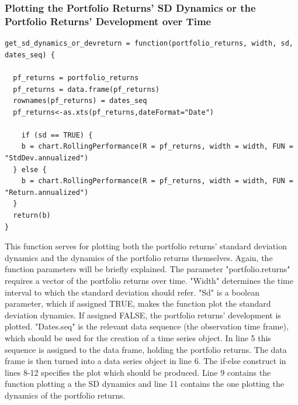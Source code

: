 \documentclass{article}
\begin{document}
\subsubsection{Plotting the Portfolio Returns' SD Dynamics or the Portfolio Returns' Development over Time}
\begin{lstlisting}[caption={This example shows how the portfolio returns' SD dynamics or the portfolio returns' dynamics are plotted in R.}, label=code:1, frame=single]
get_sd_dynamics_or_devreturn = function(portfolio_returns, width, sd, dates_seq) {

  pf_returns = portfolio_returns
  pf_returns = data.frame(pf_returns)
  rownames(pf_returns) = dates_seq
  pf_returns<-as.xts(pf_returns,dateFormat="Date")
  
    if (sd == TRUE) { 
    b = chart.RollingPerformance(R = pf_returns, width = width, FUN = "StdDev.annualized")
  } else { 
    b = chart.RollingPerformance(R = pf_returns, width = width, FUN = "Return.annualized")
  }
  return(b)
}
\end{lstlisting}
This function serves for plotting both the portfolio returns' standard deviation dynamics and the dynamics of the portfolio returns themselves. Again, the function parameters will be briefly explained. The parameter "portfolio.returns" requires a vector of the portfolio returns over time. "Width" determines the time interval to which the standard deviation should refer. "Sd" is a boolean parameter, which if assigned TRUE, makes the function plot the standard deviation dynamics. If assigned FALSE, the portfolio returns' development is plotted. "Dates.seq" is the relevant data sequence (the observation time frame), which should be used for the creation of a time series object. In line 5 this sequence is assigned to the data frame, holding the portfolio returns. The data frame is then turned into a data series object in line 6. The if-else construct in lines 8-12 specifies the plot which should be produced. Line 9 contains the function plotting a the SD dynamics and line 11 contains the one plotting the dynamics of the portfolio returns.
\end{document}
